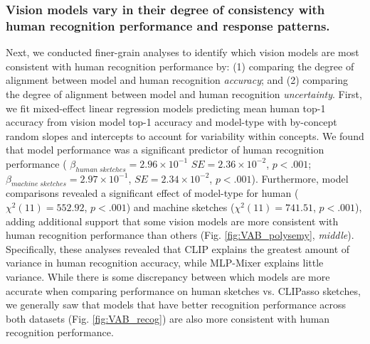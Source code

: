 \documentclass[10pt,letterpaper]{article}
\begin{document}
\subsubsection{Vision models vary in their degree of consistency with human recognition performance and response patterns.}
Next, we conducted finer-grain analyses to identify which vision models are most consistent with human recognition performance by: (1) comparing the degree of alignment between model and human recognition \textit{accuracy}; and (2) comparing the degree of alignment between model and human recognition \textit{uncertainty}.
First, we fit mixed-effect linear regression models predicting mean human top-1 accuracy from vision model top-1 accuracy and model-type with by-concept random slopes and intercepts to account for variability within concepts.
We found that model performance was a significant predictor of human recognition performance ( $\beta_{human \; sketches} = 2.96\times10^{-1}$ $SE= 2.36\times 10^{-2}$, $p<.001$; $\beta_{machine \; sketches}= 2.97\times10^{-1}$, $SE = 2.34 \times 10^{-2}$, $p<.001$). 
Furthermore, model comparisons revealed a significant effect of model-type for human ($\chi^2(11)=552.92$, $p<.001$) and machine sketches ($\chi^2(11)=741.51$, $p<.001$), adding additional support that some vision models are more consistent with human recognition performance than others (Fig. \ref{fig:VAB_polysemy}, \textit{middle}).
Specifically, these analyses revealed that CLIP explains the greatest amount of variance in human recognition accuracy, while MLP-Mixer explains little variance.
While there is some discrepancy between which models are more accurate when comparing performance on human sketches vs. CLIPasso sketches, we generally saw that models that have better recognition performance across both datasets (Fig. \ref{fig:VAB_recog}) are also more consistent with human recognition performance. 
\end{document}
